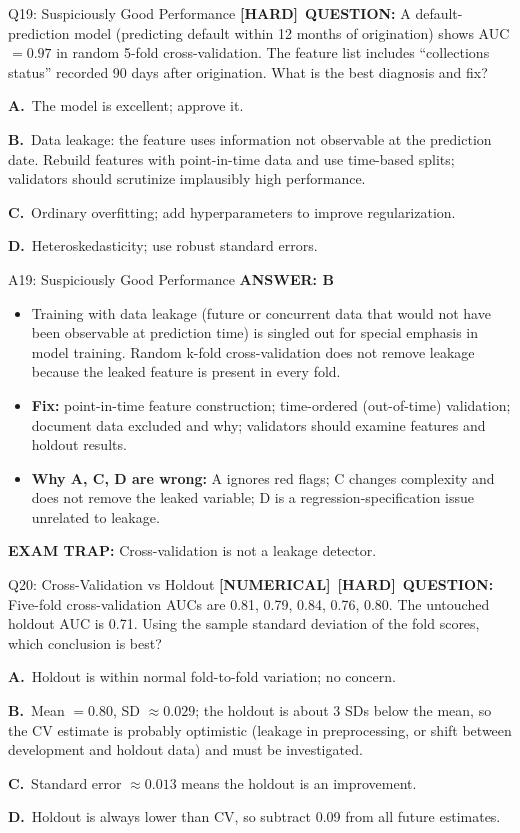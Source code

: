 \documentclass[8pt]{beamer}
\newcommand{\fs}{\fontsize{10}{12}\selectfont}
\newcommand{\opts}[4]{\par\vspace{0.12cm}\noindent\textbf{A.}~#1\par\vspace{0.08cm}\noindent\textbf{B.}~#2\par\vspace{0.08cm}\noindent\textbf{C.}~#3\par\vspace{0.08cm}\noindent\textbf{D.}~#4\par}
\newcommand{\ans}[1]{\textcolor{myblue}{\textbf{ANSWER: #1}}}
\newcommand{\trap}[1]{\textcolor{myred}{\textbf{EXAM TRAP:}} #1}
\newcommand{\numtag}{\textcolor{mypurple}{\textbf{[NUMERICAL]}}}
\newcommand{\hard}{\textcolor{myorange}{\textbf{[HARD]}}}
\begin{document}

\begin{frame}[t]{Q19: Suspiciously Good Performance}
\fs
\hard\ \textbf{QUESTION:} A default-prediction model (predicting default within 12 months of origination) shows AUC $=0.97$ in random 5-fold cross-validation. The feature list includes ``collections status'' recorded 90 days after origination. What is the best diagnosis and fix?
\opts{The model is excellent; approve it.}
{Data leakage: the feature uses information not observable at the prediction date. Rebuild features with point-in-time data and use time-based splits; validators should scrutinize implausibly high performance.}
{Ordinary overfitting; add hyperparameters to improve regularization.}
{Heteroskedasticity; use robust standard errors.}
\end{frame}

\begin{frame}[t]{A19: Suspiciously Good Performance}
\fs
\ans{B}
\begin{itemize}
\item Training with data leakage (future or concurrent data that would not have been observable at prediction time) is singled out for special emphasis in model training. Random k-fold cross-validation does not remove leakage because the leaked feature is present in every fold.
\item \textbf{Fix:} point-in-time feature construction; time-ordered (out-of-time) validation; document data excluded and why; validators should examine features and holdout results.
\item \textbf{Why A, C, D are wrong:} A ignores red flags; C changes complexity and does not remove the leaked variable; D is a regression-specification issue unrelated to leakage.
\end{itemize}
\trap{Cross-validation is \textcolor{myblue}{not} a leakage detector.}
\end{frame}

\begin{frame}[t]{Q20: Cross-Validation vs Holdout}
\fs
\numtag\ \hard\ \textbf{QUESTION:} Five-fold cross-validation AUCs are 0.81, 0.79, 0.84, 0.76, 0.80. The untouched holdout AUC is 0.71. Using the sample standard deviation of the fold scores, which conclusion is best?
\opts{Holdout is within normal fold-to-fold variation; no concern.}
{Mean $=0.80$, SD $\approx0.029$; the holdout is about 3 SDs below the mean, so the CV estimate is probably optimistic (leakage in preprocessing, or shift between development and holdout data) and must be investigated.}
{Standard error $\approx0.013$ means the holdout is an improvement.}
{Holdout is always lower than CV, so subtract 0.09 from all future estimates.}
\end{frame}
\end{document}
